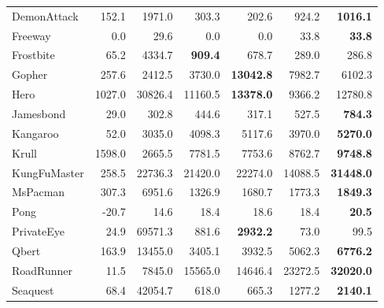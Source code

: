 \begin{table}[h]
{\begin{tabular}{lrrrrrr}
DemonAttack          &  152.1     &  1971.0    &  303.3            &  202.6              &  924.2                    &  \textbf{1016.1}     \\
Freeway              &  0.0       &  29.6      &  0.0              &  0.0                &  33.8                     &  \textbf{33.8}       \\
Frostbite            &  65.2      &  4334.7    &  \textbf{909.4}   &  678.7              &  289.0                    &  286.8               \\
Gopher               &  257.6     &  2412.5    &  3730.0           &  \textbf{13042.8}   &  7982.7                   &  6102.3              \\
Hero                 &  1027.0    &  30826.4   &  11160.5          &  \textbf{13378.0}   &  9366.2                   &  12780.8             \\
Jamesbond            &  29.0      &  302.8     &  444.6            &  317.1              &  527.5                    &  \textbf{784.3}      \\
Kangaroo             &  52.0      &  3035.0    &  4098.3           &  5117.6             &  3970.0                   &  \textbf{5270.0}     \\
Krull                &  1598.0    &  2665.5    &  7781.5           &  7753.6             &  8762.7                   &  \textbf{9748.8}     \\
KungFuMaster         &  258.5     &  22736.3   &  21420.0          &  22274.0            &  14088.5                  &  \textbf{31448.0}    \\
MsPacman             &  307.3     &  6951.6    &  1326.9           &  1680.7             &  1773.3                   &  \textbf{1849.3}     \\
Pong                 &  -20.7     &  14.6      &  18.4             &  18.6               &  18.4                     &  \textbf{20.5}       \\
PrivateEye           &  24.9      &  69571.3   &  881.6            &  \textbf{2932.2}    &  73.0                     &  99.5                \\
Qbert                &  163.9     &  13455.0   &  3405.1           &  3932.5             &  5062.3                   &  \textbf{6776.2}     \\
RoadRunner           &  11.5      &  7845.0    &  15565.0          &  14646.4            &  23272.5                  &  \textbf{32020.0}    \\
Seaquest             &  68.4      &  42054.7   &  618.0            &  665.3              &  1277.2                   &  \textbf{2140.1}     \\

\end{tabular}}
\end{table}
